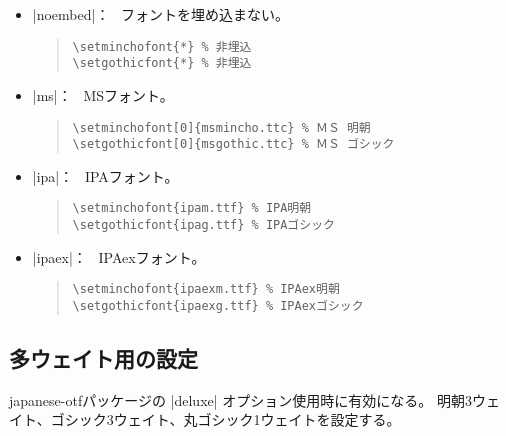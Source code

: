\documentclass[uplatex,dvipdfmx,a4paper]{jsarticle}
\newcommand{\Pkg}[1]{\textsf{#1}}
\newcommand{\Means}{：\ }
\begin{document}
\begin{itemize}
\item |noembed|\Means
  フォントを埋め込まない。
\begin{quote}\small\begin{verbatim}
\setminchofont{*} % 非埋込
\setgothicfont{*} % 非埋込
\end{verbatim}\end{quote}

\item |ms|\Means
  MSフォント。
\begin{quote}\small\begin{verbatim}
\setminchofont[0]{msmincho.ttc} % ＭＳ 明朝
\setgothicfont[0]{msgothic.ttc} % ＭＳ ゴシック
\end{verbatim}\end{quote}

\item |ipa|\Means
  IPAフォント。
\begin{quote}\small\begin{verbatim}
\setminchofont{ipam.ttf} % IPA明朝
\setgothicfont{ipag.ttf} % IPAゴシック
\end{verbatim}\end{quote}

\item |ipaex|\Means
  IPAexフォント。
\begin{quote}\small\begin{verbatim}
\setminchofont{ipaexm.ttf} % IPAex明朝
\setgothicfont{ipaexg.ttf} % IPAexゴシック
\end{verbatim}\end{quote}
\end{itemize}

\subsection{多ウェイト用の設定}

\Pkg{japanese-otf}パッケージの |deluxe| オプション使用時に有効になる。
明朝3ウェイト、ゴシック3ウェイト、丸ゴシック1ウェイトを設定する。
\end{document}

